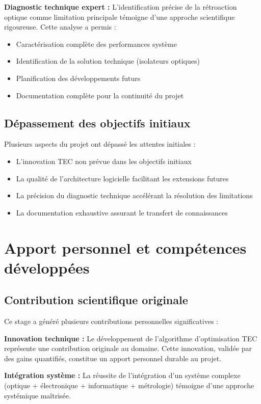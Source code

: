 \textbf{Diagnostic technique expert :}
L'identification précise de la rétroaction optique comme limitation principale témoigne d'une approche scientifique rigoureuse. Cette analyse a permis :
\begin{itemize}
    \item Caractérisation complète des performances système
    \item Identification de la solution technique (isolateurs optiques)
    \item Planification des développements futurs
    \item Documentation complète pour la continuité du projet
\end{itemize}

\subsection{Dépassement des objectifs initiaux}

Plusieurs aspects du projet ont dépassé les attentes initiales :
\begin{itemize}
    \item L'innovation TEC non prévue dans les objectifs initiaux
    \item La qualité de l'architecture logicielle facilitant les extensions futures
    \item La précision du diagnostic technique accélérant la résolution des limitations
    \item La documentation exhaustive assurant le transfert de connaissances
\end{itemize}

\section{Apport personnel et compétences développées}

\subsection{Contribution scientifique originale}

Ce stage a généré plusieurs contributions personnelles significatives :

\textbf{Innovation technique :} Le développement de l'algorithme d'optimisation TEC représente une contribution originale au domaine. Cette innovation, validée par des gains quantifiés, constitue un apport personnel durable au projet.

\textbf{Intégration système :} La réussite de l'intégration d'un système complexe (optique + électronique + informatique + métrologie) témoigne d'une approche systémique maîtrisée.

